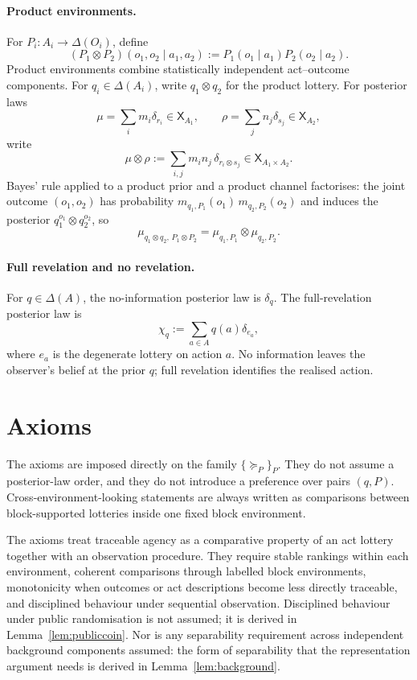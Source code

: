 \documentclass[11pt,a4paper]{article}
\theoremstyle{definition}
\newcommand{\1}{\mathbf 1}
\begin{document}
\paragraph{Product environments.}
For $P_i:A_i\to\Delta(O_i)$, define
\[
(P_1\otimes P_2)(o_1,o_2\mid a_1,a_2)
:=
P_1(o_1\mid a_1)P_2(o_2\mid a_2).
\]
Product environments combine statistically independent act--outcome components.
For $q_i\in\Delta(A_i)$, write $q_1\otimes q_2$ for the product lottery.
For posterior laws
\[
\mu=\sum_i m_i\delta_{r_i}\in\mathsf X_{A_1},
\qquad
\rho=\sum_j n_j\delta_{s_j}\in\mathsf X_{A_2},
\]
write
\[
\mu\otimes\rho
:=
\sum_{i,j}m_i n_j\,\delta_{r_i\otimes s_j}
\in\mathsf X_{A_1\times A_2}.
\]
Bayes' rule applied to a product prior and a product channel factorises: the joint outcome $(o_1,o_2)$ has probability
$m_{q_1,P_1}(o_1)\,m_{q_2,P_2}(o_2)$ and induces the posterior $q_1^{o_1}\otimes q_2^{o_2}$, so
\begin{equation}
\mu_{q_1\otimes q_2,\,P_1\otimes P_2}
=
\mu_{q_1,P_1}\otimes\mu_{q_2,P_2}.
\tag{PL}\label{eq:productlaw}
\end{equation}

\paragraph{Full revelation and no revelation.}
For $q\in\Delta(A)$, the no-information posterior law is $\delta_q$.  The full-revelation posterior law is
\[
\chi_q:=\sum_{a\in A}q(a)\delta_{e_a},
\]
where $e_a$ is the degenerate lottery on action $a$.
No information leaves the observer's belief at the prior $q$; full revelation identifies the realised action.

\section*{Axioms}

The axioms are imposed directly on the family $\{\succeq_P\}_P$.  They do not assume a posterior-law order, and they do
not introduce a preference over pairs $(q,P)$.  Cross-environment-looking statements are always written as comparisons
between block-supported lotteries inside one fixed block environment.

The axioms treat traceable agency as a comparative property of an act lottery together with an observation procedure.  They
require stable rankings within each environment, coherent comparisons through labelled block environments, monotonicity
when outcomes or act descriptions become less directly traceable, and disciplined behaviour under
sequential observation.  Disciplined behaviour under public randomisation is not
assumed; it is derived in Lemma~\ref{lem:publiccoin}.  Nor is any separability requirement across independent background
components assumed: the form of separability that the representation argument needs is derived in
Lemma~\ref{lem:background}.
\end{document}

